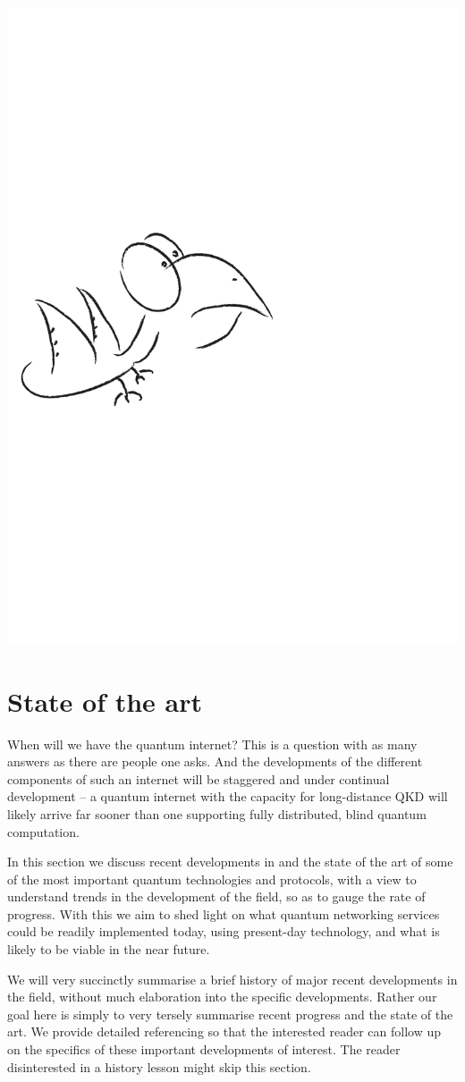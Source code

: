 \documentclass[aps, rmp, twocolumn, amsmath, amssymb, nofootinbib, superscriptaddress, longbibliography, floatfix, table-of-contents, eqsecnum]{revtex4-1}
\renewcommand{\tablename}{ALG.}
\begin{document}
\begin{center}
	\includegraphics[width=0.6\columnwidth]{sketch_31}
\end{center}

%
%

\section{State of the art} \label{sec:state_of_the_art} 

\renewcommand{\tablename}{TABLE}

When will we have the quantum internet? This is a question with as many answers as there are people one asks. And the developments of the different components of such an internet will be staggered and under continual development -- a quantum internet with the capacity for long-distance QKD will likely arrive far sooner than one supporting fully distributed, blind quantum computation.

In this section we discuss recent developments in and the state of the art of some of the most important quantum technologies and protocols, with a view to understand trends in the development of the field, so as to gauge the rate of progress. With this we aim to shed light on what quantum networking services could be readily implemented today, using present-day technology, and what is likely to be viable in the near future.

We will very succinctly summarise a brief history of major recent developments in the field, without much elaboration into the specific developments. Rather our goal here is simply to very tersely summarise recent progress and the state of the art. We provide detailed referencing so that the interested reader can follow up on the specifics of these important developments of interest. The reader disinterested in a history lesson might skip this section.
\end{document}
